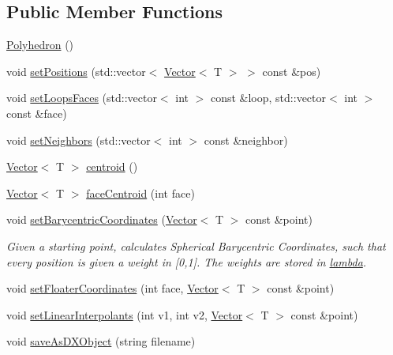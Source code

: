 \subsection*{Public Member Functions}
\begin{DoxyCompactItemize}
\item 
\hyperlink{classccmc_1_1_polyhedron_addb2fac41e80420f07ea9b3164cd11af}{Polyhedron} ()
\item 
void \hyperlink{classccmc_1_1_polyhedron_aa3d13c560359c24af71e2c5b1b159148}{set\-Positions} (std\-::vector$<$ \hyperlink{classccmc_1_1_vector}{Vector}$<$ T $>$ $>$ const \&pos)
\item 
void \hyperlink{classccmc_1_1_polyhedron_a54003232c80e3137ecb2e4732e00d3a4}{set\-Loops\-Faces} (std\-::vector$<$ int $>$ const \&loop, std\-::vector$<$ int $>$ const \&face)
\item 
void \hyperlink{classccmc_1_1_polyhedron_aac7c881c60c5ee50ec85c5ac6e6c02f6}{set\-Neighbors} (std\-::vector$<$ int $>$ const \&neighbor)
\item 
\hyperlink{classccmc_1_1_vector}{Vector}$<$ T $>$ \hyperlink{classccmc_1_1_polyhedron_a6395204653dddbd1148023ce3c04b647}{centroid} ()
\item 
\hyperlink{classccmc_1_1_vector}{Vector}$<$ T $>$ \hyperlink{classccmc_1_1_polyhedron_a587cce21871193ccfba1a7fadc2eb86b}{face\-Centroid} (int face)
\item 
void \hyperlink{classccmc_1_1_polyhedron_ab0619f44fb68fae79dc86498164a5255}{set\-Barycentric\-Coordinates} (\hyperlink{classccmc_1_1_vector}{Vector}$<$ T $>$ const \&point)
\begin{DoxyCompactList}\small\item\em Given a starting point, calculates Spherical Barycentric Coordinates, such that every position is given a weight in \mbox{[}0,1\mbox{]}. The weights are stored in \hyperlink{classccmc_1_1_polyhedron_ae398caeb579041f8da9261484deb4eed}{lambda}. \end{DoxyCompactList}\item 
void \hyperlink{classccmc_1_1_polyhedron_a32c4243a5f5dd6993d17f60e3deeda38}{set\-Floater\-Coordinates} (int face, \hyperlink{classccmc_1_1_vector}{Vector}$<$ T $>$ const \&point)
\item 
void \hyperlink{classccmc_1_1_polyhedron_af312e09c40b05c1bd376f94e3966103a}{set\-Linear\-Interpolants} (int v1, int v2, \hyperlink{classccmc_1_1_vector}{Vector}$<$ T $>$ const \&point)
\item 
void \hyperlink{classccmc_1_1_polyhedron_a3d1633e9643f81644e3e0df64f4195ca}{save\-As\-D\-X\-Object} (string filename)

\end{DoxyCompactItemize}

